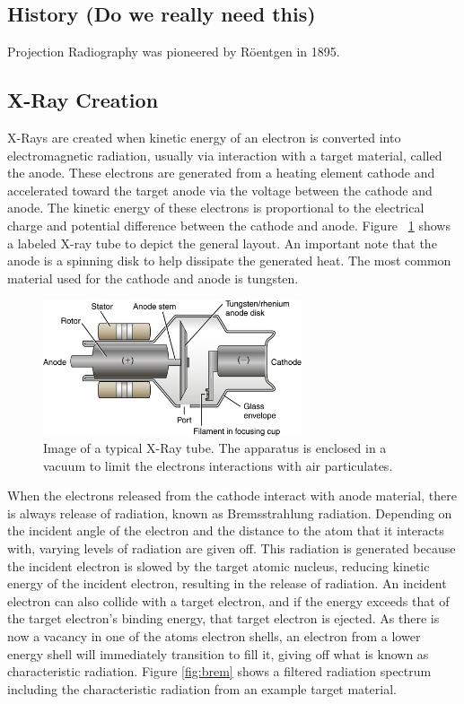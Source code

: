 \subsection{History (Do we really need this)}
Projection Radiography was pioneered by R\"oentgen in 1895. 

\subsection{X-Ray Creation}
X-Rays are created when kinetic energy of an electron is converted into electromagnetic radiation, usually via interaction with a target material, called the anode. These electrons are generated from a heating element cathode and accelerated toward the target anode via the voltage between the cathode and anode. The kinetic energy of these electrons is proportional to the electrical charge and potential difference between the cathode and anode. Figure ~\ref{fig:xrtube} shows a labeled X-ray tube to depict the general layout. An important note that the anode is a spinning disk to help dissipate the generated heat. The most common material used for the cathode and anode is tungsten. 

\begin{figure}[H]
	\centerline{\includegraphics[width=.6\columnwidth,height=4cm]
		{images/xray_tube.jpg}}
	\caption{\label{fig:xrtube} Image of a typical X-Ray tube. The apparatus is enclosed in a vacuum to limit the electrons interactions with air particulates. }
\end{figure}

When the electrons released from the cathode interact with anode material, there is always release of radiation, known as Bremsstrahlung radiation. Depending on the incident angle of the electron and the distance to the atom that it interacts with, varying levels of radiation are given off. This radiation is generated because the incident electron is slowed by the target atomic nucleus, reducing kinetic energy of the incident electron, resulting in the release of radiation. An incident electron can also collide with a target electron, and if the energy exceeds that of the target electron's binding energy, that target electron is ejected. As there is now a vacancy in one of the atoms electron shells, an electron from a lower energy shell will immediately transition to fill it, giving off what is known as characteristic radiation.  Figure \ref{fig:brem} shows a filtered radiation spectrum including the characteristic radiation from an example target material. 


